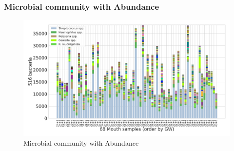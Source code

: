 \documentclass{beamer}
\begin{document}
    \begin{frame}
        \frametitle{Microbial community with Abundance}

        \begin{figure}
            \includegraphics[width=0.8 \linewidth]{figures/Step60/everything.DADA2.homd.uncorrected/Mouth.pdf}
            \caption{Microbial community with Abundance}
        \end{figure}
    \end{frame}
\end{document}
